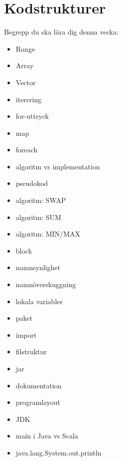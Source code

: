 \chapter{Kodstrukturer}\label{chapter:W02}
Begrepp du ska lära dig denna vecka:
\begin{multicols}{2}\begin{itemize}[nosep,label={$\square$},leftmargin=*]
\item Range
\item Array
\item Vector
\item iterering
\item for-uttryck
\item map
\item foreach
\item algoritm vs implementation
\item pseudokod
\item algoritm: SWAP
\item algoritm: SUM
\item algoritm: MIN/MAX
\item block
\item namnsynlighet
\item namnöverskuggning
\item lokala variabler
\item paket
\item import
\item filstruktur
\item jar
\item dokumentation
\item programlayout
\item JDK
\item main i Java vs Scala
\item java.lang.System.out.println\end{itemize}\end{multicols}

